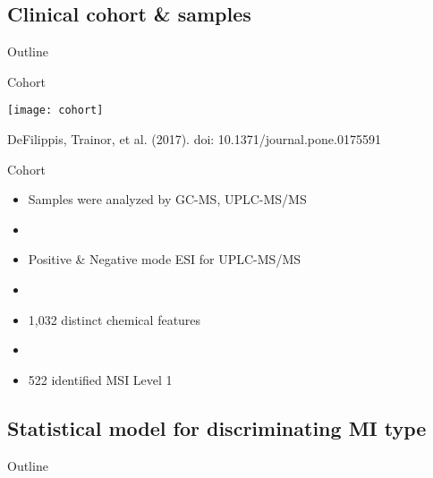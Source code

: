 \documentclass[xcolor=dvipsnames]{beamer}
\begin{document}
\subsection{Clinical cohort \& samples}
\begin{frame}{Outline}
\vspace{-10.5pt}
\tableofcontents[currentsection,subsectionstyle=show/shaded/hide]
\end{frame}

\begin{frame}{Cohort}
\vspace{-10pt}
\begin{center}
\texttt{[image: cohort]}

DeFilippis, Trainor, et al. (2017). doi: 10.1371/journal.pone.0175591
\end{center}
\end{frame}

\begin{frame}{Cohort}
\vspace{-10pt}
\begin{itemize}
\item Samples were analyzed by GC-MS, UPLC-MS/MS \pause
\item[]
\item Positive \& Negative mode ESI for UPLC-MS/MS \pause
\item[]
\item 1,032 distinct chemical features \pause
\item[]
\item 522 identified MSI Level 1
\end{itemize}
\end{frame}

\subsection{Statistical model for discriminating MI type}
\begin{frame}{Outline}
\vspace{-10.5pt}
\tableofcontents[currentsection,subsectionstyle=show/shaded/hide]
\end{frame}
\end{document}
